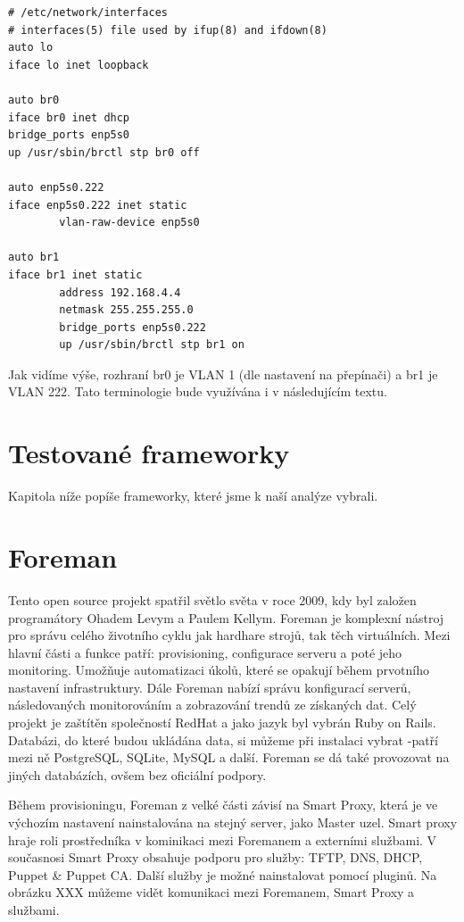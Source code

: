 \documentclass[thesis=B,czech]{FITthesis}[2012/06/26]
\begin{document}
\begin{verbatim}
# /etc/network/interfaces
# interfaces(5) file used by ifup(8) and ifdown(8)
auto lo
iface lo inet loopback

auto br0
iface br0 inet dhcp
bridge_ports enp5s0
up /usr/sbin/brctl stp br0 off

auto enp5s0.222
iface enp5s0.222 inet static
        vlan-raw-device enp5s0

auto br1
iface br1 inet static
        address 192.168.4.4
        netmask 255.255.255.0
        bridge_ports enp5s0.222
        up /usr/sbin/brctl stp br1 on
\end{verbatim}

Jak vidíme výše, rozhraní br0 je VLAN 1 (dle nastavení na přepínači) a br1 je VLAN 222. Tato terminologie bude využívána i v následujícím textu.


\section{Testované frameworky}

Kapitola níže popíše frameworky, které jsme k naší analýze vybrali.
\section{Foreman}

Tento open source projekt spatřil světlo světa v roce 2009, kdy byl založen programátory Ohadem Levym a Paulem Kellym. Foreman je komplexní nástroj pro správu celého životního cyklu jak hardhare strojů, tak těch virtuálních. Mezi hlavní části a funkce patří: provisioning, configurace serveru a poté jeho monitoring. Umožňuje automatizaci úkolů, které se opakují během prvotního nastavení infrastruktury. Dále Foreman nabízí správu konfigurací serverů, následovaných monitorováním a zobrazování trendů ze získaných dat.  Celý projekt je zaštítěn společností RedHat a jako jazyk byl vybrán Ruby on Rails. Databázi, do které budou ukládána data, si můžeme při instalaci vybrat -patří mezi ně PostgreSQL, SQLite, MySQL a další. Foreman se dá také provozovat na jiných databázích, ovšem bez oficiální podpory.

Během provisioningu, Foreman z velké části závisí na Smart Proxy, která je ve výchozím nastavení nainstalována na stejný server, jako Master uzel. Smart proxy hraje roli prostředníka v kominikaci mezi Foremanem a externími službami. V současnosi Smart Proxy obsahuje podporu pro služby: TFTP, DNS, DHCP, Puppet \& Puppet CA. Další služby je možné nainstalovat pomocí pluginů. Na obrázku XXX můžeme vidět komunikaci mezi Foremanem, Smart Proxy a službami.
\end{document}
